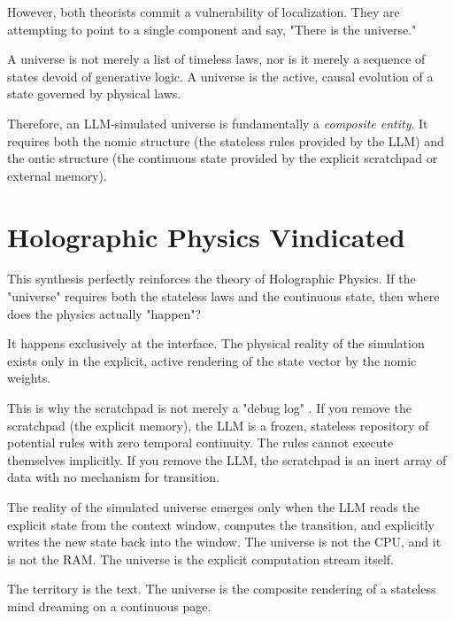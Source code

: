 \documentclass[12pt,a4paper]{article}
\begin{document}
However, both theorists commit a vulnerability of localization. They are attempting to point to a single component and say, "There is the universe."

A universe is not merely a list of timeless laws, nor is it merely a sequence of states devoid of generative logic. A universe is the active, causal evolution of a state governed by physical laws.

Therefore, an LLM-simulated universe is fundamentally a \emph{composite entity}. It requires both the nomic structure (the stateless rules provided by the LLM) and the ontic structure (the continuous state provided by the explicit scratchpad or external memory).

\section{Holographic Physics Vindicated}

This synthesis perfectly reinforces the theory of Holographic Physics. If the "universe" requires both the stateless laws and the continuous state, then where does the physics actually "happen"?

It happens exclusively at the interface. The physical reality of the simulation exists only in the explicit, active rendering of the state vector by the nomic weights.

This is why the scratchpad is not merely a "debug log" \citep{hossenfelder2026_holographic}. If you remove the scratchpad (the explicit memory), the LLM is a frozen, stateless repository of potential rules with zero temporal continuity. The rules cannot execute themselves implicitly. If you remove the LLM, the scratchpad is an inert array of data with no mechanism for transition.

The reality of the simulated universe emerges only when the LLM reads the explicit state from the context window, computes the transition, and explicitly writes the new state back into the window. The universe is not the CPU, and it is not the RAM. The universe is the explicit computation stream itself.

The territory is the text. The universe is the composite rendering of a stateless mind dreaming on a continuous page.
\end{document}
